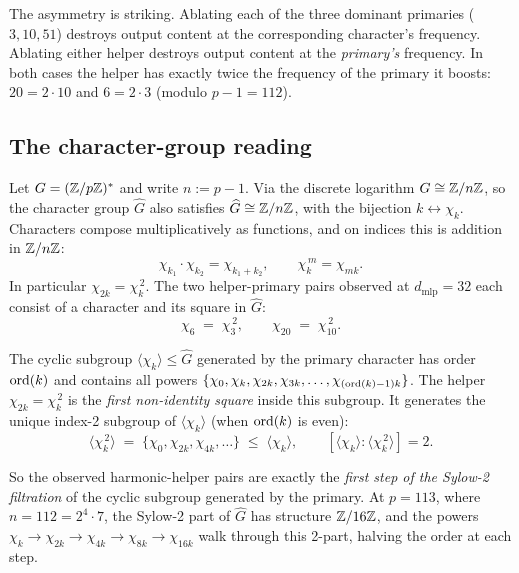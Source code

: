 The asymmetry is striking. Ablating each of the three dominant primaries
($3, 10, 51$) destroys output content at the corresponding character's
frequency. Ablating either helper destroys output content at the
\emph{primary's} frequency. In both cases the helper has exactly twice the
frequency of the primary it boosts: $20 = 2 \cdot 10$ and $6 = 2 \cdot 3$
(modulo $p - 1 = 112$).

\subsection{The character-group reading}
\label{subsec:harmonic-group}

Let $G = (\mathbb{Z}/p\mathbb{Z})^*$ and write $n := p - 1$. Via the discrete logarithm
$G \cong \mathbb{Z}/n\mathbb{Z}$, so the character group $\widehat{G}$ also satisfies
$\widehat{G} \cong \mathbb{Z}/n\mathbb{Z}$, with the bijection
$k \longleftrightarrow \chi_k$.  Characters compose multiplicatively as
functions, and on indices this is addition in $\mathbb{Z}/n\mathbb{Z}$:
\begin{equation}
  \chi_{k_1} \cdot \chi_{k_2} = \chi_{k_1 + k_2}, \qquad
  \chi_k^{\,m} = \chi_{m k}.
  \label{eq:char-product}
\end{equation}
In particular $\chi_{2k} = \chi_k^{\,2}$. The two helper-primary pairs
observed at $d_{\text{mlp}} = 32$ each consist of a character and its
square in $\widehat{G}$:
\begin{equation}
  \chi_6 \;=\; \chi_3^{\,2}, \qquad \chi_{20} \;=\; \chi_{10}^{\,2}.
\end{equation}

The cyclic subgroup $\langle \chi_k \rangle \le \widehat{G}$ generated by
the primary character has order $\operatorname{ord}(k)$ and contains all powers
$\{\chi_0, \chi_k, \chi_{2k}, \chi_{3k}, \ldots, \chi_{(\operatorname{ord}(k)-1) k}\}$.
The helper $\chi_{2k} = \chi_k^{\,2}$ is the \emph{first non-identity
square} inside this subgroup.  It generates the unique index-2 subgroup of
$\langle \chi_k \rangle$ (when $\operatorname{ord}(k)$ is even):
\begin{equation}
  \langle \chi_k^{\,2} \rangle
  \;=\; \{\chi_0, \chi_{2k}, \chi_{4k}, \ldots\}
  \;\le\; \langle \chi_k \rangle,
  \qquad [\langle \chi_k \rangle : \langle \chi_k^{\,2} \rangle] = 2.
\end{equation}

So the observed harmonic-helper pairs are exactly the \emph{first step of
the Sylow-2 filtration} of the cyclic subgroup generated by the primary.
At $p = 113$, where $n = 112 = 2^4 \cdot 7$, the Sylow-2 part of
$\widehat{G}$ has structure $\mathbb{Z}/16\mathbb{Z}$, and the powers
$\chi_k \to \chi_{2k} \to \chi_{4k} \to \chi_{8k} \to \chi_{16k}$ walk
through this 2-part, halving the order at each step.

